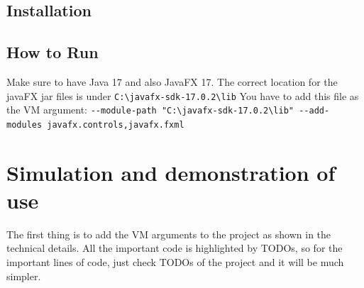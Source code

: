 \documentclass[
]{report}
\begin{document}
\hypertarget{installation}{%
\section{Installation}\label{installation}}

\hypertarget{how-to-run}{%
\section{How to Run}\label{how-to-run}}

Make sure to have Java 17 and also JavaFX 17.
The correct location for the javaFX jar files is under \texttt{C:\textbackslash{}javafx-sdk-17.0.2\textbackslash{}lib}
You have to add this file as the VM argument: \texttt{-\/-module-path\ "C:\textbackslash{}javafx-sdk-17.0.2\textbackslash{}lib"\ -\/-add-modules\ javafx.controls,javafx.fxml}

\hypertarget{simulation-and-demonstration-of-use}{%
\chapter{Simulation and demonstration of use}\label{simulation-and-demonstration-of-use}}

The first thing is to add the VM arguments to the project as shown in the technical details. All the important code is highlighted by TODOs, so for the important lines of code, just check TODOs of the project and it will be much simpler.

  
\end{document}
